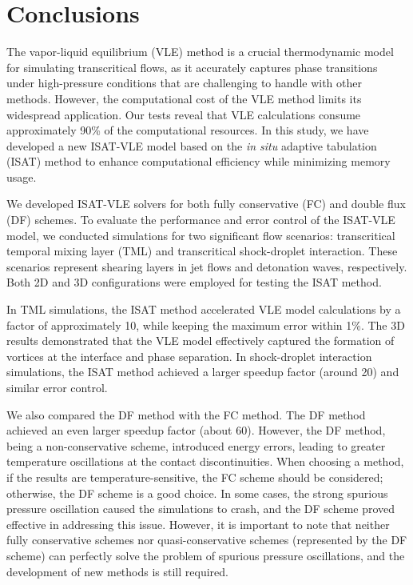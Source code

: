 \section{Conclusions} \label{sec:conclusion}
The vapor-liquid equilibrium (VLE) method is a crucial thermodynamic model for simulating transcritical flows, as it accurately captures phase transitions under high-pressure conditions that are challenging to handle with other methods. However, the computational cost of the VLE method limits its widespread application. Our tests reveal that VLE calculations consume approximately 90\% of the computational resources. In this study, we have developed a new ISAT-VLE model based on the \textit{in situ} adaptive tabulation (ISAT) method to enhance computational efficiency while minimizing memory usage.

We developed ISAT-VLE solvers for both fully conservative (FC) and double flux (DF) schemes. To evaluate the performance and error control of the ISAT-VLE model, we conducted simulations for two significant flow scenarios: transcritical temporal mixing layer (TML) and transcritical shock-droplet interaction. These scenarios represent shearing layers in jet flows and detonation waves, respectively. Both 2D and 3D configurations were employed for testing the ISAT method. 

In TML simulations, the ISAT method accelerated VLE model calculations by a factor of approximately 10, while keeping the maximum error within 1\%. The 3D results demonstrated that the VLE model effectively captured the formation of vortices at the interface and phase separation. In shock-droplet interaction simulations, the ISAT method achieved a larger speedup factor (around 20) and similar error control. 

We also compared the DF method with the FC method. The DF method achieved an even larger speedup factor (about 60). However, the DF method, being a non-conservative scheme, introduced energy errors, leading to greater temperature oscillations at the contact discontinuities. When choosing a method, if the results are temperature-sensitive, the FC scheme should be considered; otherwise, the DF scheme is a good choice. In some cases, the strong spurious pressure oscillation caused the simulations to crash, and the DF scheme proved effective in addressing this issue. However, it is important to note that neither fully conservative schemes nor quasi-conservative schemes (represented by the DF scheme) can perfectly solve the problem of spurious pressure oscillations, and the development of new methods is still required.

